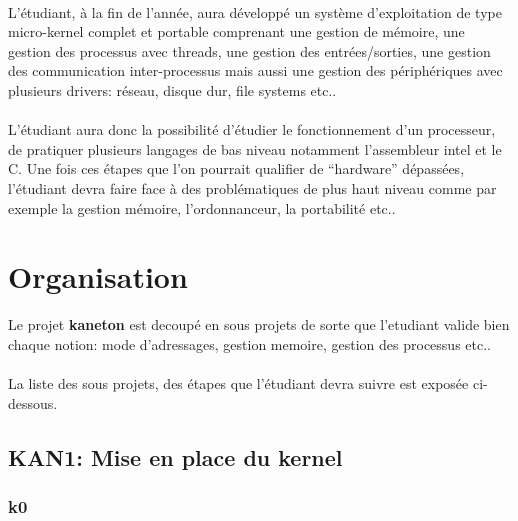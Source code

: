 \documentclass[10pt,a4wide]{article}
\begin{document}
\paragraph{}

L'\'etudiant, \`a la fin de l'ann\'ee, aura d\'evelopp\'e un syst\`eme
d'exploitation de type micro-kernel complet et portable comprenant une
gestion de m\'emoire, une gestion des processus avec threads, une gestion
des entr\'ees/sorties, une gestion des communication inter-processus
mais aussi une gestion des p\'eriph\'eriques avec plusieurs drivers:
r\'eseau, disque dur, file systems etc..

\paragraph{}

L'\'etudiant aura donc la possibilit\'e d'\'etudier le fonctionnement d'un
processeur, de pratiquer plusieurs langages de bas niveau notamment
l'assembleur intel et le C. Une fois ces \'etapes que l'on pourrait
qualifier de ``hardware'' d\'epass\'ees, l'\'etudiant devra faire face
\`a des probl\'ematiques de plus haut niveau comme par exemple la gestion
m\'emoire, l'ordonnanceur, la portabilit\'e etc..

\newpage

\section{Organisation}

Le projet \textbf{kaneton} est decoup\'e en sous projets de sorte que
l'etudiant valide bien chaque notion: mode d'adressages, gestion memoire,
gestion des processus etc..

\paragraph{}

La liste des sous projets, des \'etapes que l'\'etudiant devra suivre est
expos\'ee ci-dessous.

\newpage

\subsection{KAN1: Mise en place du kernel}

\subsubsection{k0}
\end{document}
